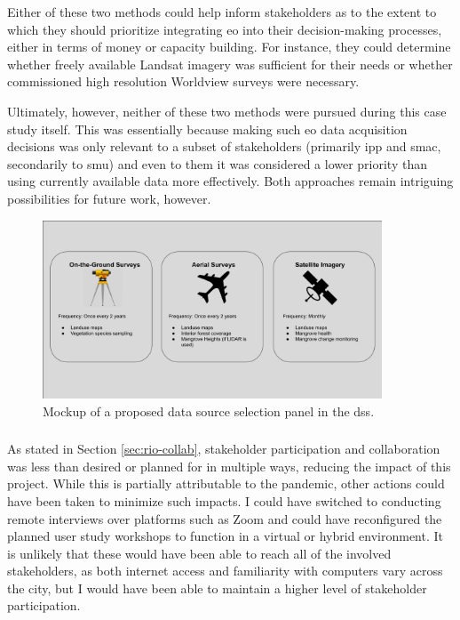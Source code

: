 Either of these two methods could help inform stakeholders as to the extent to which they should prioritize integrating \ac{eo} into their decision-making processes, either in terms of money or capacity building. For instance, they could determine whether freely available Landsat imagery was sufficient for their needs or whether commissioned high resolution Worldview surveys were necessary. 

Ultimately, however, neither of these two methods were pursued during this case study itself. This was essentially because making such \ac{eo} data acquisition decisions was only relevant to a subset of stakeholders (primarily \ac{ipp} and \ac{smac}, secondarily to \ac{smu}) and even to them it was considered a lower priority than using currently available data more effectively. Both approaches remain intriguing possibilities for future work, however.


\begin{figure}[!htb] 
\centering
\includegraphics[width=0.9\textwidth]{Figures/chap4/data_source_selection_panel.png}
\caption[Mockup of Rio DSS Data Source Selection]{Mockup of a proposed data source selection panel in the \ac{dss}.}
\label{fig:data_source_selection_panel}
\end{figure}
	

\subsubsection{} \label{sec:rio-discuss-stakeholder}

As stated in Section \ref{sec:rio-collab}, stakeholder participation and collaboration was less than desired or planned for in multiple ways, reducing the impact of this project. While this is partially attributable to the pandemic, other actions could have been taken to minimize such impacts. I could have switched to conducting remote interviews over platforms such as Zoom and could have reconfigured the planned user study workshops to function in a virtual or hybrid environment. It is unlikely that these would have been able to reach all of the involved stakeholders, as both internet access and familiarity with computers vary across the city, but I would have been able to maintain a higher level of stakeholder participation.

